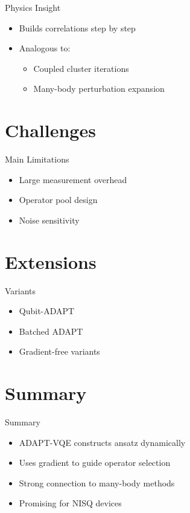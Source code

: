 \documentclass{beamer}
\begin{document}
\begin{frame}{Physics Insight}
\begin{itemize}
\item Builds correlations step by step
\item Analogous to:
\begin{itemize}
\item Coupled cluster iterations
\item Many-body perturbation expansion
\end{itemize}
\end{itemize}
\end{frame}

\section{Challenges}

\begin{frame}{Main Limitations}
\begin{itemize}
\item Large measurement overhead
\item Operator pool design
\item Noise sensitivity
\end{itemize}
\end{frame}

\section{Extensions}

\begin{frame}{Variants}
\begin{itemize}
\item Qubit-ADAPT
\item Batched ADAPT
\item Gradient-free variants
\end{itemize}
\end{frame}

\section{Summary}

\begin{frame}{Summary}
\begin{itemize}
\item ADAPT-VQE constructs ansatz dynamically
\item Uses gradient to guide operator selection
\item Strong connection to many-body methods
\item Promising for NISQ devices
\end{itemize}
\end{frame}
\end{document}
